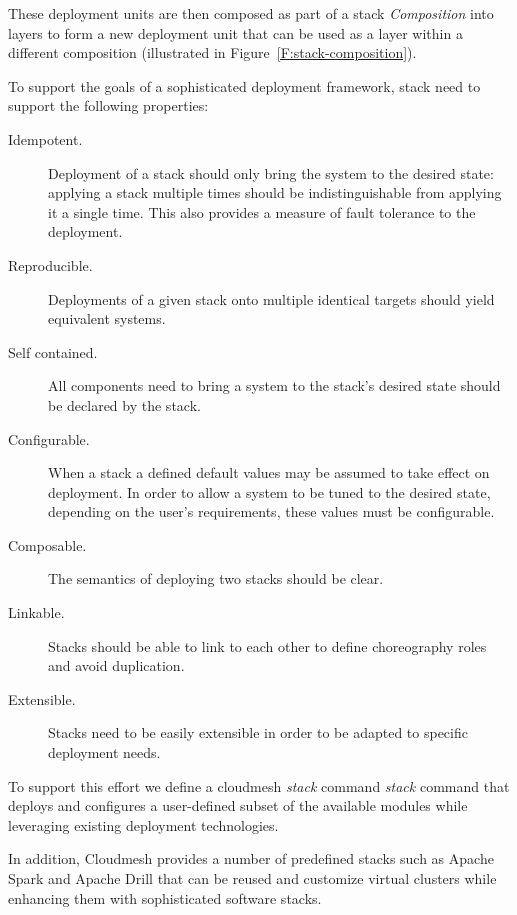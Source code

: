 These deployment units are then composed as part of a stack {\it
  Composition} into layers to form a new deployment unit that can be
used as a layer within a different composition (illustrated in 
Figure~\ref{F:stack-composition}).



To support the goals of a sophisticated deployment framework, stack
need to support the following properties:

\begin{description}

\item [Idempotent.]  Deployment of a stack should only bring the
  system to the desired state: applying a stack multiple times should
  be indistinguishable from applying it a single time. This also
  provides a measure of fault tolerance to the deployment.

\item [Reproducible.] Deployments of a given stack onto multiple
  identical targets should yield equivalent systems.

\item [Self contained.] All components need to bring a system to the
  stack's desired state should be declared by the stack.

\item [Configurable.] When a stack a defined default values may be
  assumed to take effect on deployment. In order to allow a system to
  be tuned to the desired state, depending on the user's requirements,
  these values must be configurable.

\item [Composable.] The semantics of deploying two stacks should be clear.

\item [Linkable.] Stacks should be able to link to each other to
  define choreography roles and avoid duplication.

\item [Extensible.] Stacks need to be easily extensible in order to be
  adapted to specific deployment needs.

\end{description}

To support this effort we define a cloudmesh {\em stack} command {\it
  stack} command that deploys and configures a user-defined subset of
the available modules while leveraging existing deployment
technologies.

In addition, Cloudmesh provides a number of predefined stacks such as
Apache Spark and Apache Drill that can be reused and customize virtual
clusters while enhancing them with sophisticated software stacks. 


